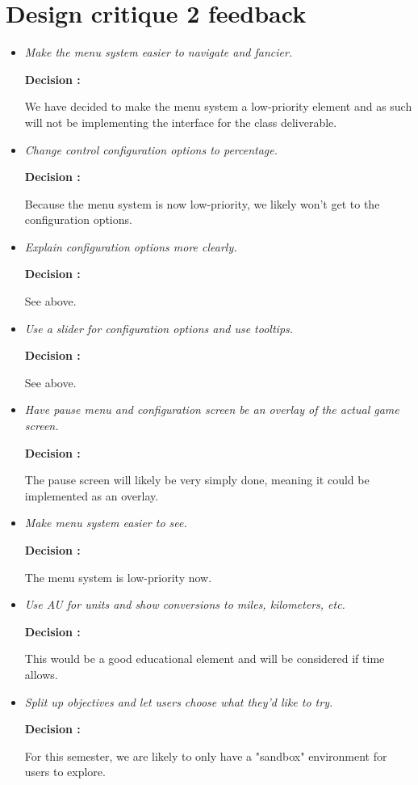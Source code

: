 \section{Design critique 2 feedback}

\begin{itemize}

  \item \emph{Make the menu system easier to navigate and fancier.}
        
        \textbf{Decision : } \parbox[t]{5in}{We have decided to make the menu system a low-priority element and as such will not be implementing the interface for the class deliverable.}

	\item \emph{Change control configuration options to percentage.}

				\textbf{Decision : } \parbox[t]{5in}{Because the menu system is now low-priority, we likely won't get to the configuration options.}

	\item \emph{Explain configuration options more clearly.}

				\textbf{Decision : } \parbox[t]{5in}{See above.}

	\item \emph{Use a slider for configuration options and use tooltips.}

				\textbf{Decision : } \parbox[t]{5in}{See above.}

	\item \emph{Have pause menu and configuration screen be an overlay of the actual game screen.}

				\textbf{Decision : } \parbox[t]{5in}{The pause screen will likely be very simply done, meaning it could be implemented as an overlay.}

	\item \emph{Make menu system easier to see.}

				\textbf{Decision : } \parbox[t]{5in}{The menu system is low-priority now.}

	\item \emph{Use AU for units and show conversions to miles, kilometers, etc.}

				\textbf{Decision : } \parbox[t]{5in}{This would be a good educational element and will be considered if time allows.}

	\item \emph{Split up objectives and let users choose what they'd like to try.}

				\textbf{Decision : } \parbox[t]{5in}{For this semester, we are likely to only have a "sandbox" environment for users to explore.}

\end{itemize}

